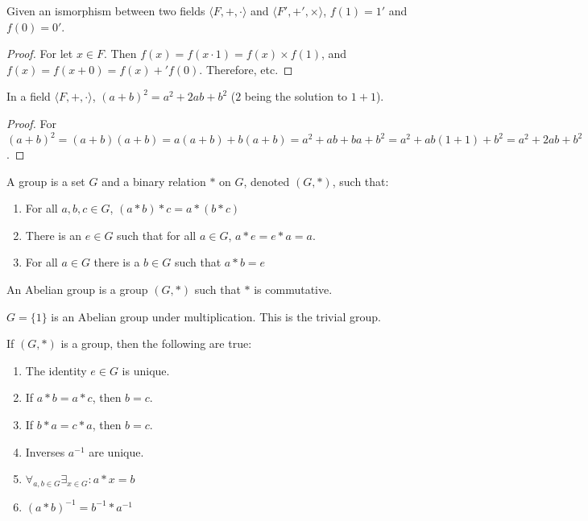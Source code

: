     \begin{theorem}
    Given an ismorphism between two fields $\langle F,+,\cdot \rangle$ and $\langle F', +',\times \rangle$, $f(1) = 1'$ and $f(0) = 0'$.
    \end{theorem}
    \begin{proof}
    For let $x\in F$. Then $f(x)=f(x\cdot 1) = f(x)\times f(1)$, and $f(x)=f(x+0) = f(x)+'f(0)$. Therefore, etc.
    \end{proof}
    \begin{theorem}
    In a field $\langle F,+,\cdot \rangle$, $(a+ b)^2 = a^2 + 2ab + b^2$ ($2$ being the solution to $1+1$).
    \end{theorem}
    \begin{proof}
    For $(a+b)^2 = (a+b)(a+b) = a(a+b)+b(a+b) = a^2 + ab + ba + b^2 = a^2 +ab(1+1)+b^2 = a^2 + 2ab + b^2$.
    \end{proof}
    \begin{definition}
        A group is a set $G$ and a binary relation $*$
        on $G$, denoted $(G,*)$, such that:
        \begin{enumerate}
            \item For all ${a,b,c}\in{G}$, $(a*b)*c=a*(b*c)$
            \item There is an ${e}\in{G}$ such that for all
                ${a}\in{G}$, $a*e=e*a=a$.
            \item For all ${a}\in{G}$ there is a ${b}\in{G}$
                such that $a*b=e$
        \end{enumerate}
    \end{definition}
    \begin{definition}
        An Abelian group is a group $(G,*)$ such that
        $*$ is commutative.
    \end{definition}
    \begin{example}
        $G=\{1\}$ is an Abelian group under multiplication.
        This is the trivial group.
    \end{example}
    \begin{theorem}
        If $(G,*)$ is a group, then the following are true:
        \begin{enumerate}
            \item The identity ${e}\in{G}$ is unique.
            \item If $a*b=a*c$, then $b=c$.
            \item If $b*a=c*a$, then $b=c$.
            \item Inverses $a^{-1}$ are unique.
            \item $\forall_{{a,b}\in{G}}\exists_{{x}\in{G}}:a*x=b$
            \item $(a*b)^{-1}=b^{-1}*a^{-1}$
        \end{enumerate}
    \end{theorem}
